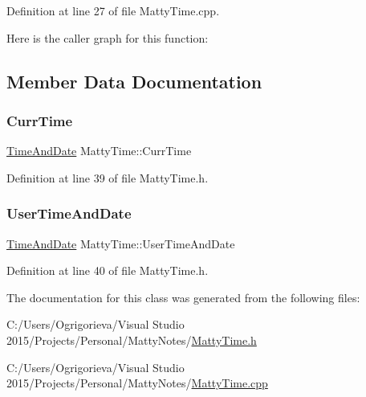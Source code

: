 Definition at line 27 of file Matty\+Time.\+cpp.

Here is the caller graph for this function\+:


\subsection{Member Data Documentation}
\hypertarget{classMattyTime_a458337456f43243073ae78976e86618f}{}\label{classMattyTime_a458337456f43243073ae78976e86618f} 
\subsubsection{\texorpdfstring{Curr\+Time}{CurrTime}}
{\footnotesize\ttfamily \hyperlink{structTimeAndDate}{Time\+And\+Date} Matty\+Time\+::\+Curr\+Time\hspace{0.3cm}{\ttfamily [static]}}



Definition at line 39 of file Matty\+Time.\+h.

\hypertarget{classMattyTime_a7a1ceab576011e56405b49d7bd81e475}{}\label{classMattyTime_a7a1ceab576011e56405b49d7bd81e475} 
\subsubsection{\texorpdfstring{User\+Time\+And\+Date}{UserTimeAndDate}}
{\footnotesize\ttfamily \hyperlink{structTimeAndDate}{Time\+And\+Date} Matty\+Time\+::\+User\+Time\+And\+Date}



Definition at line 40 of file Matty\+Time.\+h.



The documentation for this class was generated from the following files\+:\begin{DoxyCompactItemize}
\item 
C\+:/\+Users/\+Ogrigorieva/\+Visual Studio 2015/\+Projects/\+Personal/\+Matty\+Notes/\hyperlink{MattyTime_8h}{Matty\+Time.\+h}\item 
C\+:/\+Users/\+Ogrigorieva/\+Visual Studio 2015/\+Projects/\+Personal/\+Matty\+Notes/\hyperlink{MattyTime_8cpp}{Matty\+Time.\+cpp}\end{DoxyCompactItemize}

